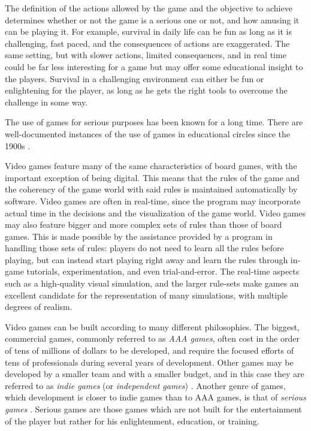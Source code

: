 The definition of the actions allowed by the game and the objective to achieve determines whether or not the game is a serious one or not, and how amusing it can be playing it. For example, survival in daily life can be fun as long as it is challenging, fast paced, and the consequences of actions are exaggerated. The same setting, but with slower actions, limited consequences, and in real time could be far less interesting for a game but may offer some educational insight to the players. Survival in a challenging environment can either be fun or enlightening for the player, as long as he gets the right tools to overcome the challenge in some way.

The use of games for serious purposes has been known for a long time. There are well-documented instances of the use of games in educational circles since the 1900s \cite{CHAPTER_1_EDUCATIONAL_GAMES_1900}.

Video games feature many of the same characteristics of board games, with the important exception of being digital. This means that the rules of the game and the coherency of the game world with said rules is maintained automatically by software. Video games are often in real-time, since the program may incorporate actual time in the decisions and the visualization of the game world. Video games may also feature bigger and more complex sets of rules than those of board games. This is made possible by the assistance provided by a program in handling those sets of rules: players do not need to learn all the rules before playing, but can instead start playing right away and learn the rules through in-game tutorials, experimentation, and even trial-and-error. The real-time aspects such as a high-quality visual simulation, and the larger rule-sets make games an excellent candidate for the representation of many simulations, with multiple degrees of realism. 

Video games can be built according to many different philosophies. The biggest, commercial games, commonly referred to as \textit{AAA games}, often cost in the order of tens of millions of dollars to be developed, and require the focused efforts of tens of professionals during several years of development. Other games may be developed by a smaller team and with a smaller budget, and in this case they are referred to as \textit{indie games} (or \textit{independent games}) \cite{CHAPTER_1_INDIE_GAMES_ON_SMARTPHONES_AND_TABLETS}. Another genre of games, which development is closer to indie games than to AAA games, is that of \textit{serious games} \cite{CHAPTER_1_SERIOUS_GAMES}. Serious games are those games which are not built for the entertainment of the player but rather for his enlightenment, education, or training. 


